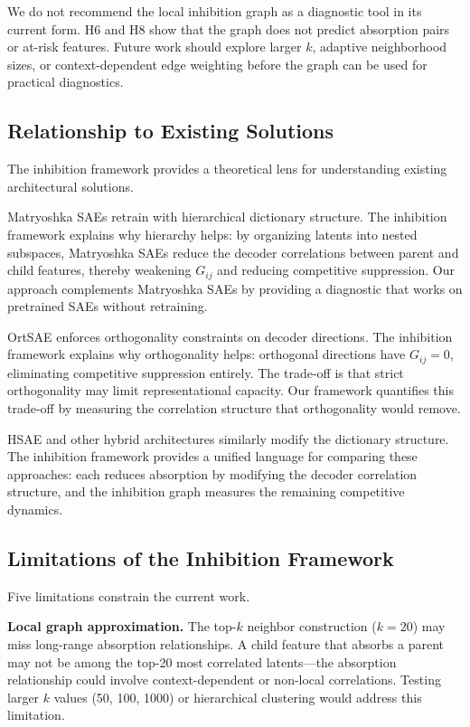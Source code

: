 \documentclass{article}
\begin{document}
We do not recommend the local inhibition graph as a diagnostic tool in its current form. H6 and H8 show that the graph does not predict absorption pairs or at-risk features. Future work should explore larger $k$, adaptive neighborhood sizes, or context-dependent edge weighting before the graph can be used for practical diagnostics.

\subsection{Relationship to Existing Solutions}

The inhibition framework provides a theoretical lens for understanding existing architectural solutions.

Matryoshka SAEs \citep{bussmann2025matryoshka} retrain with hierarchical dictionary structure. The inhibition framework explains why hierarchy helps: by organizing latents into nested subspaces, Matryoshka SAEs reduce the decoder correlations between parent and child features, thereby weakening $G_{ij}$ and reducing competitive suppression. Our approach complements Matryoshka SAEs by providing a diagnostic that works on pretrained SAEs without retraining.

OrtSAE \citep{korznikov2025ort} enforces orthogonality constraints on decoder directions. The inhibition framework explains why orthogonality helps: orthogonal directions have $G_{ij} = 0$, eliminating competitive suppression entirely. The trade-off is that strict orthogonality may limit representational capacity. Our framework quantifies this trade-off by measuring the correlation structure that orthogonality would remove.

HSAE and other hybrid architectures similarly modify the dictionary structure. The inhibition framework provides a unified language for comparing these approaches: each reduces absorption by modifying the decoder correlation structure, and the inhibition graph measures the remaining competitive dynamics.

\subsection{Limitations of the Inhibition Framework}
\label{sec:limitations}

Five limitations constrain the current work.

\textbf{Local graph approximation.} The top-$k$ neighbor construction ($k = 20$) may miss long-range absorption relationships. A child feature that absorbs a parent may not be among the top-20 most correlated latents---the absorption relationship could involve context-dependent or non-local correlations. Testing larger $k$ values (50, 100, 1000) or hierarchical clustering would address this limitation.
\end{document}
